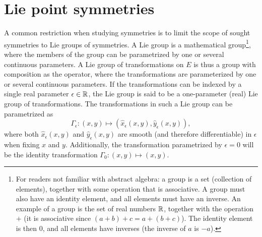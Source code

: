 \section{Lie point symmetries}

A common restriction when studying symmetries is to limit the scope of sought symmetries to Lie groups of symmetries.
A Lie group is a mathematical group\footnote{For readers not familiar with abstract algebra: a group is a set (collection of elements), together with some operation that is associative. A group must also have an identity element, and all elements must have an inverse. An example of a group is the set of real numbers \(\mathbb{R}\), together with the operation \(+\) (it is associative since \((a + b) + c = a + (b + c)\)). The identity element is then \(0\), and all elements have inverses (the inverse of \(a\) is \(-a\)).}, where the members of the group can be parametrized by one or several continuous parameters.
A Lie group of transformations on \(E\) is thus a group with composition as the operator, where the transformations are parameterized by one or several continuous parameters.
If the transformations can be indexed by a single real parameter \(\epsilon \in \mathbb{R}\), the Lie group is said to be a one-parameter (real) Lie group of transformations.
The transformations in such a Lie group can be parametrized as
\begin{equation*} %
  \Gamma_\epsilon: \left(x,y\right) \mapsto \left(\hat{x}_\epsilon(x,y), \hat{y}_\epsilon(x,y)\right),
\end{equation*}
where both \(\hat{x}_\epsilon(x,y)\) and \(\hat{y}_\epsilon(x,y)\) are smooth (and therefore differentiable) in \(\epsilon\) when fixing \(x\) and \(y\).
Additionally, the transformation parametrized by \(\epsilon = 0\) will be the identity transformation \(\Gamma_0: \left(x,y\right) \mapsto \left(x,y\right)\).

